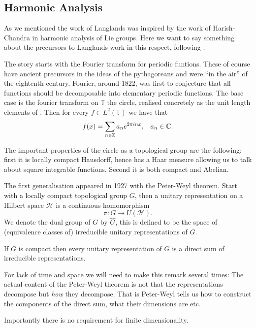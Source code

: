 \subsection{Harmonic Analysis}
As we mentioned the work of Langlands was inspired by the work of Harish-Chandra in harmonic analysis of Lie groups. Here we want to say something about the precursors to Langlands work in this respect, following \cite{follandCourseAbstractHarmonic2016a}.

The story starts with the Fourier transform for periodic funtions. These of course have ancient precursors in the ideas of the pythagoreans and were ``in the air'' of the eightenth century, Fourier, around 1822, was first to conjecture that all functions should be decomposable into elementary periodic functions. 
The base case is the fourier transform on \(\mathbb{T}\) the circle, realised concretely as the unit length elements of \C. Then for every \(f\in L^2(\mathbb{T})\) we have that 
\[f(x) = \sum_{n\in \Z}a_ne^{2\pi i n x}, \;\;\; a_n\in \C.\]

The important properties of the circle as a topological group are the following: first it is locally compact Hausdorff, hence has a Haar measure allowing us to talk about square integrable functions. Second it is both compact and Abelian. 

The first generalisation appeared in 1927 with the Peter-Weyl theorem. Start with a locally compact topological group \(G\), then a unitary representation on a Hilbert space \(\mathcal{H}\) is a continuous homomorphism 
\[\pi: G \to U(\mathcal{H}).\]
We denote the dual group of \(G\) by \(\hat{G}\), this is defined to be the space of (equivalence classes of) irreducible unitary representations of \(G\). 

\begin{Theorem}
	If \(G\) is compact then every unitary representation of \(G\) is a direct sum of irreducible representations. 
\end{Theorem} 
\begin{remark}
	For lack of time and space we will need to make this remark several times: The actual content of the Peter-Weyl theorem is not that the representations decompose but \textit{how} they decompose. That is Peter-Weyl tells us how to construct the components of the direct sum, what their dimensions are etc.
\end{remark}
Importantly there is no requirement for finite dimensionality. 

